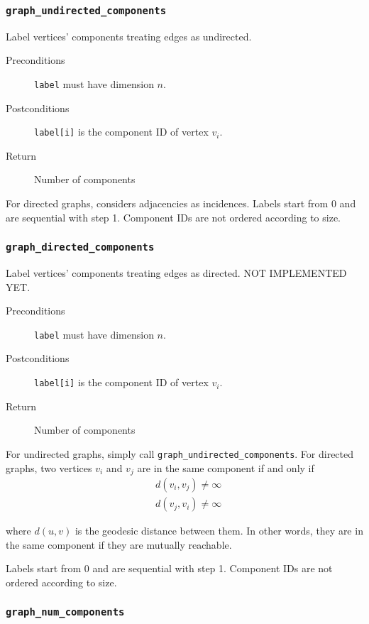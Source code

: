 \documentclass[a4paper,10pt]{article}
\begin{document}
\subsubsection{\texttt{graph\_undirected\_components}}

Label vertices' components treating edges as undirected.

\begin{description}
 \item[Preconditions] \texttt{label} must have dimension $n$.
 \item[Postconditions] \texttt{label[i]} is the component ID of vertex $v_i$.
 \item[Return] Number of components
\end{description}

For directed graphs, considers adjacencies as incidences.
Labels start from 0 and are sequential with step 1.
Component IDs are not ordered according to size.

\subsubsection{\texttt{graph\_directed\_components}}

Label vertices' components treating edges as directed. NOT IMPLEMENTED YET.

\begin{description}
 \item[Preconditions] \texttt{label} must have dimension $n$.
 \item[Postconditions] \texttt{label[i]} is the component ID of vertex $v_i$.
 \item[Return] Number of components
\end{description}

For undirected graphs, simply call \texttt{graph\_undirected\_components}. For 
directed graphs, two vertices $v_i$ and $v_j$ are in the same component if and
only if
\begin{align*}
 &d(v_i, v_j) \neq \infty \\
 &d(v_j, v_i) \neq \infty
\end{align*}

where $d(u,v)$ is the geodesic distance between them. In other words, they are
in the same component if they are mutually reachable.

Labels start from 0 and are sequential with step 1.
Component IDs are not ordered according to size.

\subsubsection{\texttt{graph\_num\_components}}
\end{document}
